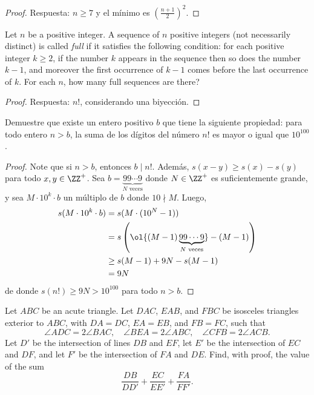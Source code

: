 \begin{proof}
	Respuesta: $n\ge 7$ y el mínimo es $\left(\frac{n+1}{2}\right)^2$.
\end{proof}

\begin{probMR}
	Let $n$ be a positive integer. A sequence of $n$ positive integers (not necessarily distinct) is called \emph{full} if it satisfies the following condition: for each positive integer $k\ge 2$, if the number $k$ appears in the sequence then so does the number $k-1$, and moreover the first occurrence of $k-1$ comes before the last occurrence of $k$. For each $n$, how many full sequences are there?
\end{probMR}

\begin{proof}
	Respuesta: $n!$, considerando una biyección.
\end{proof}


\begin{probEG}[Russia 2022]
	Demuestre que existe un entero positivo $b$ que tiene la siguiente propiedad: para todo entero $n>b$, la suma de los dígitos del número $n!$ es mayor o igual que $10^{100}$.
\end{probEG}

\begin{proof}
	Note que si $n>b$, entonces $b\mid n!$. Además, $s(x-y)\ge s(x)-s(y)$ para todo $x,y\in\ZZ^+$. Sea $b=\underbrace{99\cdots 9}_{N\text{ veces}}$ donde $N\in\ZZ^+$ es suficientemente grande, y sea $M\cdot 10^k\cdot b$ un múltiplo de $b$ donde $10\nmid M$. Luego,
	\begin{align*}
		s(M\cdot 10^k\cdot b)
		&=s(M\cdot(10^N-1))\\
		&=s\left(\ol{(M-1)\underbrace{99\cdots 9}_{N\text{ veces}}}-(M-1)\right)\\
		&\ge s(M-1)+9N-s(M-1)\\
		&=9N
	\end{align*}
	de donde $s(n!)\ge 9N>10^{100}$ para todo $n>b$.
\end{proof}


\begin{probEG}
	Let $ABC$ be an acute triangle. Let $DAC$, $EAB$, and $FBC$ be isosceles triangles exterior to $ABC$, with $DA=DC$, $EA=EB$, and $FB=FC$, such that
	\[\angle ADC=2\angle BAC,\quad\angle BEA=2\angle ABC,\quad\angle CFB=2\angle ACB.\]
	Let $D'$ be the intersection of lines $DB$ and $EF$, let $E'$ be the intersection of $EC$ and $DF$, and let $F'$ be the intersection of $FA$ and $DE$. Find, with proof, the value of the sum
	\[\frac{DB}{DD'}+\frac{EC}{EE'}+\frac{FA}{FF'}.\]
\end{probEG}

